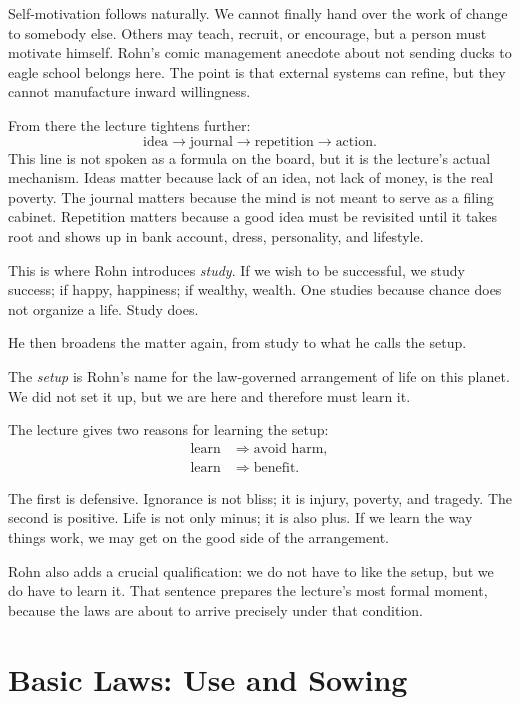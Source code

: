 Self-motivation follows naturally. We cannot finally hand over the work of change to somebody else. Others may teach, recruit, or encourage, but a person must motivate himself. Rohn's comic management anecdote about not sending ducks to eagle school belongs here. The point is that external systems can refine, but they cannot manufacture inward willingness.

From there the lecture tightens further:
\begin{equation}
\text{idea} \to \text{journal} \to \text{repetition} \to \text{action}.
\end{equation}
This line is not spoken as a formula on the board, but it is the lecture's actual mechanism. Ideas matter because lack of an idea, not lack of money, is the real poverty. The journal matters because the mind is not meant to serve as a filing cabinet. Repetition matters because a good idea must be revisited until it takes root and shows up in bank account, dress, personality, and lifestyle.

This is where Rohn introduces \emph{study}. If we wish to be successful, we study success; if happy, happiness; if wealthy, wealth. One studies because chance does not organize a life. Study does.

He then broadens the matter again, from study to what he calls the setup.

\begin{definition}
The \emph{setup} is Rohn's name for the law-governed arrangement of life on this planet. We did not set it up, but we are here and therefore must learn it.
\end{definition}

The lecture gives two reasons for learning the setup:
\begin{align}
\text{learn} &\Rightarrow \text{avoid harm},\\
\text{learn} &\Rightarrow \text{benefit}.
\end{align}

The first is defensive. Ignorance is not bliss; it is injury, poverty, and tragedy. The second is positive. Life is not only minus; it is also plus. If we learn the way things work, we may get on the good side of the arrangement.

Rohn also adds a crucial qualification: we do not have to like the setup, but we do have to learn it. That sentence prepares the lecture's most formal moment, because the laws are about to arrive precisely under that condition.

\section{Basic Laws: Use and Sowing}

